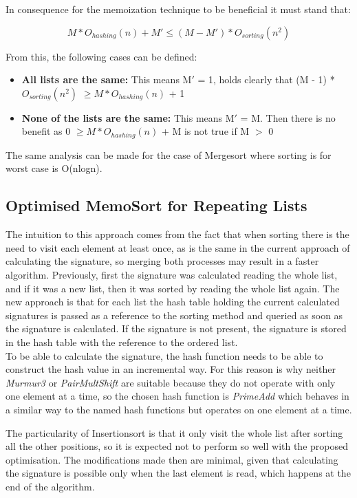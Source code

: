 \documentclass[a4paper,12pt]{article}
\begin{document}
In consequence for the memoization technique to be beneficial it must stand that:

\begin{equation}
 M * O_{hashing}(n)+ M' \leq  (M - M') *  O_{sorting}(n^2)
\end{equation}

From this, the following cases can be defined:
\begin{itemize}
\item {\bf All lists are the same:}  This means M$'$ = 1, holds clearly that (M - 1) *   $O_{sorting}(n^2)$   $\geq M *O_{hashing}(n)$ + 1
\item {\bf None of the lists are the same:} This means M$'$ = M. Then there is no benefit as 0 $ \geq M * O_{hashing}(n)$ + M is not true if M $>$ 0
\end{itemize}

The same analysis can be made for the case of Mergesort where sorting is for worst case is O(nlogn). \\

\subsection{Optimised MemoSort for Repeating Lists} \label{OptMemoSort}
The intuition to this approach comes from the fact that when sorting there is the need to visit each element at least once, as is the same in the current approach of calculating the signature, so merging both processes may result in a faster algorithm. Previously, first the signature was calculated reading the whole list, and if it was a new list, then it was sorted by reading the whole list again.
The new approach is that for each list the hash table holding the current calculated signatures is passed as a reference to the sorting method and queried as soon as the signature is calculated. If the signature is not present, the signature is stored in the hash table with the reference to the ordered list. \\

To be able to calculate the signature, the hash function needs to be able to construct the hash value in an incremental way. For this reason is why neither {\it Murmur3} or {\it PairMultShift}  are suitable because they do not operate with only one element at a time, so the chosen hash function is {\it PrimeAdd} which behaves in a similar way to the named hash functions but operates on one element at a time.

The particularity of Insertionsort is that it only visit the whole list after sorting all the other positions, so it is expected not to perform so well with the proposed optimisation. The modifications made then are minimal, given that calculating the signature is possible only when the last element is read, which happens at the end of the algorithm.
\end{document}
